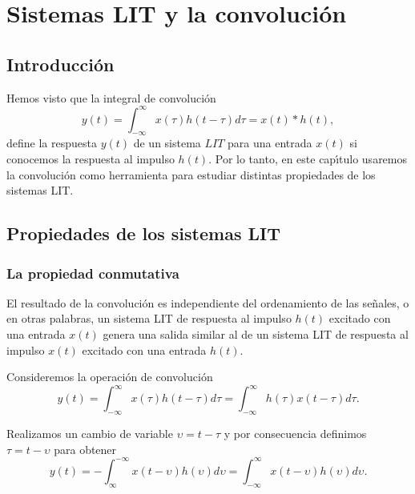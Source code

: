 \chapter{Sistemas LIT y la convoluci\'{o}n}

\section{Introducci\'{o}n}

Hemos visto que la integral de convoluci\'{o}n 
\begin{equation}
        y\left( t\right) =
        \int_{-\infty }^{\infty }x\left( \tau \right) h\left(t-\tau \right) d\tau =
        x\left( t\right) * h\left( t\right) ,
\end{equation}
define la respuesta $y(t)$ de un sistema $LIT$ para una entrada $x(t)$ si conocemos la respuesta al 
impulso $h(t)$. Por lo tanto, en este cap\'{\i}tulo usaremos la convoluci\'{o}n como herramienta para 
estudiar distintas propiedades de los sistemas LIT.

\section{Propiedades de los sistemas LIT}

\subsection{La propiedad conmutativa}

El resultado de la convoluci\'{o}n es independiente del ordenamiento de las se\~{n}ales, o en otras 
palabras, un sistema LIT de respuesta al impulso $h(t)$ excitado con una entrada $x(t)$ genera una salida 
similar al de un sistema LIT de respuesta al impulso $x(t)$ excitado con una entrada $h(t)$.

Consideremos la operaci\'{o}n de convoluci\'{o}n
\begin{equation}
        y\left( t\right) =
                \int_{-\infty }^{\infty }x\left( \tau \right) h\left(t-\tau \right) d\tau =
                \int_{-\infty }^{\infty }h\left( \tau \right) x\left(t-\tau \right) d\tau .
\end{equation}

Realizamos un cambio de variable $\upsilon =t-\tau $ y por consecuencia definimos $\tau =t-\upsilon $ 
para obtener
\begin{equation}
        y\left( t\right) = 
                -\int_{\infty }^{-\infty }x\left( t-\upsilon \right)h\left( \upsilon \right) d\upsilon =
                \int_{-\infty }^{\infty }x\left(t-\upsilon \right) h\left( \upsilon \right) d\upsilon .
\end{equation}

